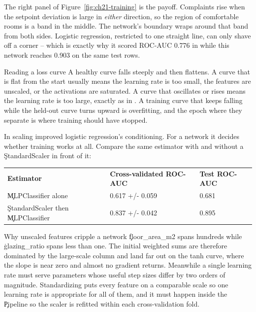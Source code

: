 The right panel of Figure~\ref{fig:ch21-training} is the payoff. Complaints rise
when the setpoint deviation is large in \emph{either} direction, so the region of
comfortable rooms is a band in the middle. The network's boundary wraps around
that band from both sides. Logistic regression, restricted to one straight line,
can only shave off a corner -- which is exactly why it scored ROC-AUC 0.776 in
 while this network reaches 0.903 on the same test
rows.

\begin{ExplainBox}{Reading a loss curve}
A healthy curve falls steeply and then flattens. A curve that is flat from the
start usually means the learning rate is too small, the features are unscaled, or
the activations are saturated. A curve that oscillates or rises means the
learning rate is too large, exactly as in . A
training curve that keeps falling while the held-out curve turns upward is
overfitting, and the epoch where they separate is where training should have
stopped.
\end{ExplainBox}


In  scaling improved logistic regression's
conditioning. For a network it decides whether training works at all. Compare the
same estimator with and without a \c{StandardScaler} in front of it:

\begin{center}
\begin{tabular}{lll}
\textbf{Estimator} & \textbf{Cross-validated ROC-AUC} & \textbf{Test ROC-AUC} \\
\c{MLPClassifier} alone & 0.617 +/- 0.059 & 0.681 \\
\c{StandardScaler} then \c{MLPClassifier} & 0.837 +/- 0.042 & 0.895 \\
\end{tabular}
\end{center}

\begin{ExplainBox}{Why unscaled features cripple a network}
\c{floor_area_m2} spans hundreds while \c{glazing_ratio} spans less than one. The
initial weighted sums are therefore dominated by the large-scale column and land
far out on the tanh curve, where the slope is near zero and almost no gradient
returns. Meanwhile a single learning rate must serve parameters whose useful step
sizes differ by two orders of magnitude. Standardizing puts every feature on a
comparable scale so one learning rate is appropriate for all of them, and it must
happen inside the \c{Pipeline} so the scaler is refitted within each
cross-validation fold.
\end{ExplainBox}

